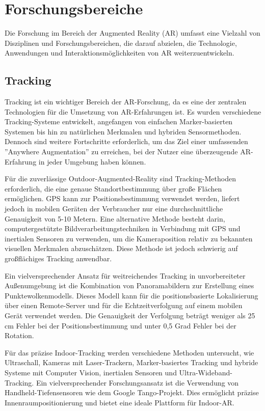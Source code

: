 \section{Forschungsbereiche}
Die Forschung im Bereich der Augmented Reality (AR) umfasst eine Vielzahl von
Disziplinen und Forschungsbereichen, die darauf abzielen, die Technologie,
Anwendungen und Interaktionsmöglichkeiten von AR weiterzuentwickeln.

\subsection{Tracking}
Tracking ist ein wichtiger Bereich der AR-Forschung, da es eine der zentralen
Technologien für die Umsetzung von AR-Erfahrungen ist. Es wurden verschiedene
Tracking-Systeme entwickelt, angefangen von einfachen Marker-basierten Systemen
bis hin zu natürlichen Merkmalen und hybriden Sensormethoden. Dennoch sind
weitere Fortschritte erforderlich, um das Ziel einer umfassenden ''Anywhere
Augmentation'' zu erreichen, bei der Nutzer eine überzeugende AR-Erfahrung in
jeder Umgebung haben können.

Für die zuverlässige Outdoor-Augmented-Reality sind Tracking-Methoden
erforderlich, die eine genaue Standortbestimmung über große Flächen
ermöglichen. GPS kann zur Positionsbestimmung verwendet werden, liefert jedoch
in mobilen Geräten der Verbraucher nur eine durchschnittliche Genauigkeit von
5-10 Metern. Eine alternative Methode besteht darin, computergestützte
Bildverarbeitungstechniken in Verbindung mit GPS und inertialen Sensoren zu
verwenden, um die Kameraposition relativ zu bekannten visuellen Merkmalen
abzuschätzen. Diese Methode ist jedoch schwierig auf großflächiges Tracking
anwendbar.

Ein vielversprechender Ansatz für weitreichendes Tracking in unvorbereiteter
Außenumgebung ist die Kombination von Panoramabildern zur Erstellung eines
Punktewolkenmodells. Dieses Modell kann für die positionsbasierte Lokalisierung
über einen Remote-Server und für die Echtzeitverfolgung auf einem mobilen Gerät
verwendet werden. Die Genauigkeit der Verfolgung beträgt weniger als 25 cm
Fehler bei der Positionsbestimmung und unter 0,5 Grad Fehler bei der Rotation.

Für das präzise Indoor-Tracking werden verschiedene Methoden untersucht, wie
Ultraschall, Kameras mit Laser-Trackern, Marker-basiertes Tracking und hybride
Systeme mit Computer Vision, inertialen Sensoren und Ultra-Wideband-Tracking.
Ein vielversprechender Forschungsansatz ist die Verwendung von
Handheld-Tiefensensoren wie dem Google Tango-Projekt. Dies ermöglicht präzise
Innenraumpositionierung und bietet eine ideale Plattform für Indoor-AR.

